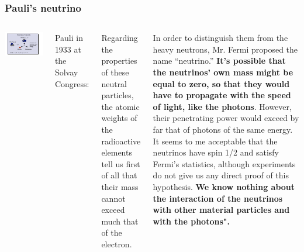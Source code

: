 \begin{frame}
\frametitle{Pauli's neutrino}
\begin{columns}
\includegraphics[scale=0.3]{img/pauli-neutrino.png}

\noindent Pauli in  1933 at the Solvay Congress: 

Regarding the properties of these neutral particles, the atomic weights
of the radioactive elements tell us first of all that their mass cannot exceed
much that of the electron.

 In order to distinguish them from the heavy
neutrons, Mr. Fermi proposed the name ``neutrino.'' {\bf It's possible that the
neutrinos' own mass might be equal to zero, so that they would have to
propagate with the speed of light, like the photons}. However, their penetrating power would exceed by far that of photons of the same energy. It
seems to me acceptable that the neutrinos have spin 1/2 and satisfy Fermi's 
statistics, although experiments do not give us any direct proof of this hypothesis. 
{\bf We know nothing about the interaction of the neutrinos with other material particles and with the photons".}
\end{columns}
\end{frame}

